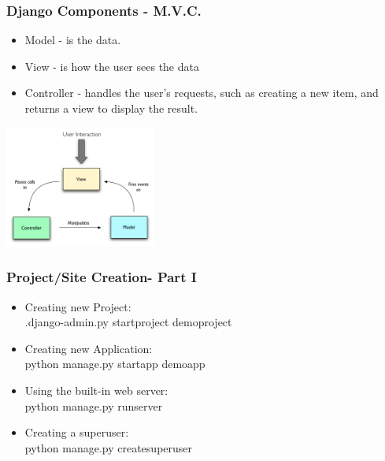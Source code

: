 \documentclass{beamer}
\begin{document}
\begin{frame}
\frametitle{Django Components - M.V.C.}
\begin{itemize}
  \item Model - is the data.
      
  \item View - is how the user sees the data

  \item Controller - handles the user's requests, such as creating a new item, and returns a view to display the result.
\end{itemize}
\begin{center}
\includegraphics[height = 4cm]{mvc.png}
\end{center}
\end{frame}

\begin{frame}
\frametitle{Project/Site Creation- Part I}
\begin{itemize}
	\item Creating new Project: \hfill \\ \hspace{35pt} .django-admin.py startproject demoproject

	\item Creating new Application: \hfill\\ \hspace{35pt} python manage.py startapp demoapp

	\item Using the built-in web server: \hfill\\ \hspace{35pt} python manage.py runserver
		  
	\item Creating a superuser: \hfill\\ \hspace{35pt} python manage.py createsuperuser
			
			
\end{itemize}
\end{frame}
\end{document}
